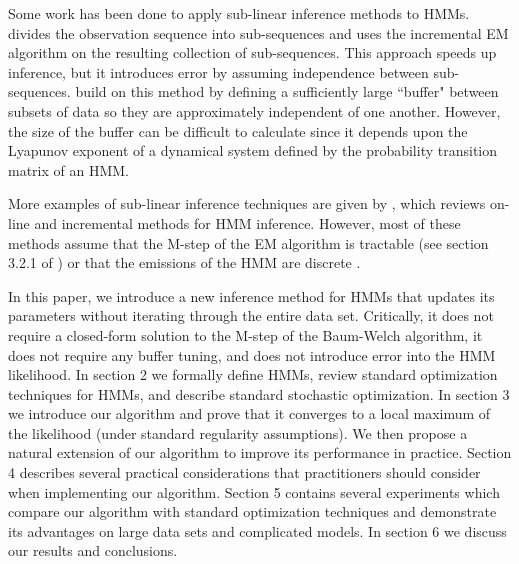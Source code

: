 Some work has been done to apply sub-linear inference methods to HMMs.
\citet{Gotoh:1998} divides the observation sequence into sub-sequences
and uses the incremental EM algorithm on the resulting collection of sub-sequences. This approach speeds up inference, but it introduces error by assuming independence between sub-sequences. \citet{Ye:2017} build on this method by defining a sufficiently large ``buffer" between subsets of data so they are approximately independent of one another. %
However, the size of the buffer can be difficult to calculate since it depends upon the Lyapunov exponent of a dynamical system defined by the probability transition matrix of an HMM.

More examples of sub-linear inference techniques are given by \citet{Khreich:2012}, which reviews on-line and incremental methods for HMM inference. However, most of these methods assume that the M-step of the EM algorithm is tractable (see section 3.2.1 of \citet{Khreich:2012}) or that the emissions of the HMM are discrete \citep{Baldi:1993}. 

In this paper, we introduce a new inference method for HMMs that updates its parameters without iterating through the entire data set. Critically, it does not require a closed-form solution to the M-step of the Baum-Welch algorithm, it does not require any buffer tuning, and does not introduce error into the HMM likelihood. In section 2 we formally define HMMs, review standard optimization techniques for HMMs, and describe standard stochastic optimization. In section 3 we introduce our algorithm and prove that it converges to a local maximum of the likelihood (under standard regularity assumptions). We then propose a natural extension of our algorithm to improve its performance in practice. Section 4 describes several practical considerations that practitioners should consider when implementing our algorithm. Section 5 contains several experiments which compare our algorithm with standard optimization techniques and demonstrate its advantages on large data sets and complicated models. In section 6 we discuss our results and conclusions.

